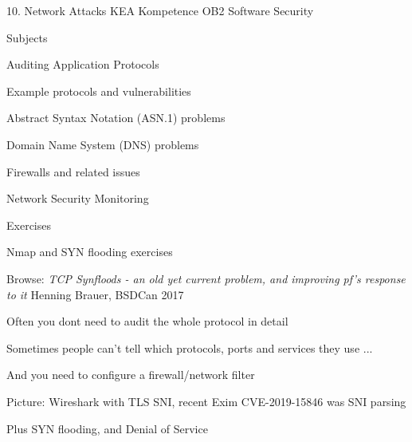 \documentclass[Screen16to9,17pt]{foils}
\begin{document}
\mytitlepage
{10. Network Attacks}
{KEA Kompetence OB2 Software Security}


\begin{list1}
\item Subjects
\begin{list2}
\item Auditing Application Protocols
\item Example protocols and vulnerabilities
\item Abstract Syntax Notation (ASN.1) problems
\item Domain Name System (DNS) problems
\item Firewalls and related issues
\item Network Security Monitoring
\end{list2}
\item Exercises
\begin{list2}
\item Nmap and SYN flooding exercises
\end{list2}
\end{list1}


\begin{list1}
\item Browse: \emph{TCP Synfloods - an old yet current problem, and improving pf's response to it}
Henning Brauer, BSDCan 2017 
\end{list1}





\begin{list1}
\item Often you dont need to audit the whole protocol in detail
\item Sometimes people can't tell which protocols, ports and services they use ...
\item And you need to configure a firewall/network filter
\item Picture: Wireshark with TLS SNI, recent Exim CVE-2019-15846 was SNI parsing
\item Plus SYN flooding, and Denial of Service
\end{list1}
\end{document}
